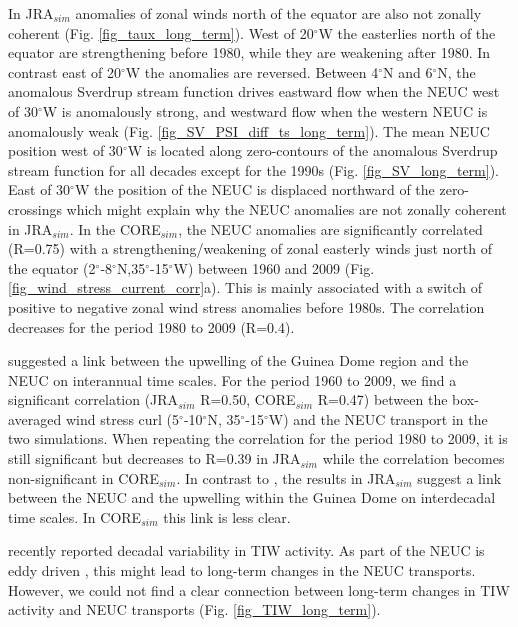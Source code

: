 \documentclass[os, manuscript]{copernicus}
\begin{document}
	In JRA$_{sim}$ anomalies of zonal winds north of the equator are also not zonally coherent (Fig. \ref{fig_taux_long_term}). West of 20$^{\circ}$W the easterlies north of the equator are strengthening before 1980, while they are weakening after 1980. In contrast east of 20$^{\circ}$W the anomalies are reversed. Between 4$^{\circ}$N and 6$^{\circ}$N, the anomalous Sverdrup stream function drives eastward flow when the NEUC west of 30$^{\circ}$W is anomalously strong, and westward flow when the western NEUC is anomalously weak (Fig. \ref{fig_SV_PSI_diff_ts_long_term}). The mean NEUC position west of 30$^{\circ}$W is located along zero-contours of the anomalous Sverdrup stream function for all decades except for the 1990s (Fig. \ref{fig_SV_long_term}). East of 30$^{\circ}$W the position of the NEUC is displaced northward of the zero-crossings which might explain why the NEUC anomalies are not zonally coherent in JRA$_{sim}$. In the CORE$_{sim}$, the NEUC anomalies are significantly correlated  (R=0.75) with a strengthening/weakening of zonal easterly winds just north of the equator (2$^{\circ}$-8$^{\circ}$N,35$^{\circ}$-15$^{\circ}$W) between 1960 and 2009  (Fig. \ref{fig_wind_stress_current_corr}a). This is mainly associated with a switch of positive to negative zonal wind stress anomalies before 1980s. The correlation decreases for the period 1980 to 2009 (R=0.4). 
	
	\cite{Goes2013} suggested a link between the upwelling of the Guinea Dome region and the NEUC on interannual time scales. For the period 1960 to 2009, we find a significant correlation (JRA$_{sim}$ R=0.50, CORE$_{sim}$ R=0.47) between the box-averaged wind stress curl (5$^{\circ}$-10$^{\circ}$N, 35$^{\circ}$-15$^{\circ}$W) and the NEUC transport in the two simulations. When repeating the correlation for the period 1980 to 2009, it is still significant but decreases to R=0.39 in JRA$_{sim}$ while the correlation becomes non-significant in CORE$_{sim}$. In contrast to \cite{Goes2013}, the results in JRA$_{sim}$ suggest a link between the NEUC and the upwelling within the Guinea Dome on interdecadal time scales. In CORE$_{sim}$ this link is less clear.
	
	\cite{Tuchen2022a} recently reported decadal variability in TIW activity. As part of the NEUC is eddy driven \citep[e.g. ][]{Jochum2004b,Assene2020}, this might lead to long-term changes in the NEUC transports. However, we could not find a clear connection between long-term changes in TIW activity and NEUC transports (Fig. \ref{fig_TIW_long_term}).
	
\end{document}

